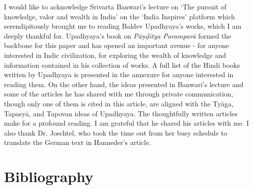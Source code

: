 I would like to acknowledge Srivarta Banwari’s lecture on ‘The pursuit of knowledge, valor and wealth in India’ on the ‘India Inspires’ platform which serendipitously brought me to reading Baldev Upadhyaya’s works, which I am deeply thankful for. Upadhyaya’s book on \textit{Pāṇḍitya Paramparā} formed the backbone for this paper and has opened an important avenue - for anyone interested in Indic civilization, for exploring the wealth of knowledge and information contained in his collection of works. A full list of the Hindi books written by Upadhyaya is presented in the annexure for anyone interested in reading them. On the other hand, the ideas presented in Banwari’s lecture and some of the articles he has shared with me through private communication, though only one of them is cited in this article, are aligned with the Tyāga, Tapasyā, and Tapovan ideas of Upadhyaya. The thoughtfully written articles make for a profound reading. I am grateful that he shared his articles with me. I also thank Dr. Joschtel, who took the time out from her busy schedule to translate the German text in Hanneder’s article.


\section*{Bibliography}

